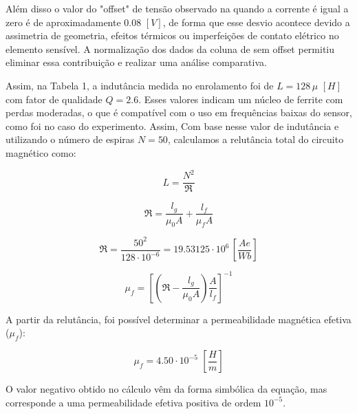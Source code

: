 \documentclass[10pt,twocolumn,letterpaper]{article}
\begin{document}
\hspace{1cm} Além disso o valor do "offset" de tensão observado na quando a corrente é igual a zero é de aproximadamente  $0.08 \,\,[V]$,  de forma  que esse desvio acontece devido a assimetria de geometria, efeitos térmicos ou imperfeições de contato elétrico no elemento sensível. A normalização dos dados da coluna de sem offset permitiu eliminar essa contribuição e realizar uma análise comparativa.

\hspace{1cm} Assim, na Tabela 1, a indutância medida no enrolamento foi de  $L=128 \, \mu \, \, [H]$   com fator de qualidade $Q=2.6$. Esses valores indicam um núcleo de ferrite com perdas moderadas, o que é compatível com o uso em frequências baixas do sensor, como foi no caso do experimento. Assim, Com base nesse valor de indutância e utilizando o número de espiras $N=50$, calculamos a relutância total do circuito magnético como: 


\begin{equation*}
    L = \frac{N^2}{\mathfrak{R}}
\end{equation*}

\vspace{-.5cm}

\begin{equation*}
    \mathfrak{R} = \frac{l_g}{\mu_0A} + \frac{l_f}{\mu_fA}
\end{equation*}

\vspace{-.5cm}

\begin{equation*}
    \mathfrak{R} = \frac{50^2}{128\cdot10^{-6}} = 19.53125\cdot 10^6 \, \left[\frac{Ae}{Wb}\right]
\end{equation*}

\vspace{-.5cm}

\begin{equation*}
    \mu_f = \left[ \left( \mathfrak{R} - \frac{l_g}{\mu_0A} \right) \frac{A}{l_f} \right]^{-1}
\end{equation*}

A partir da relutância, foi possível determinar a permeabilidade magnética efetiva ($\mu_f$): 

$$\mu_f=4.50\cdot 10^{-5} \,\, \left[\frac{H}{m}\right]$$

\hspace{1cm} O valor negativo obtido no cálculo vêm da forma simbólica da equação, mas corresponde a uma permeabilidade efetiva positiva de ordem $10^{-5}$.
\end{document}
